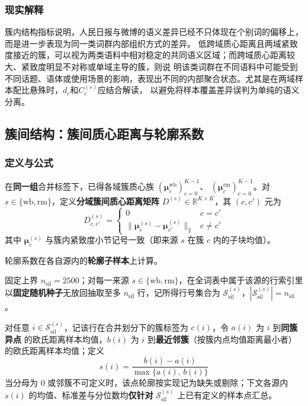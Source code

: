 \documentclass[withoutpreface]{cumcmthesis}
\begin{document}
\FloatBarrier

\subsubsection{现实解释}
簇内结构指标说明，人民日报与微博的语义差异已经不只体现在个别词的偏移上，而是进一步表现为同一类词群内部组织方式的差异。
低跨域质心距离且两域紧致度接近的簇，可以视为两类语料中相对稳定的共同语义区域；而跨域质心距离较大、紧致度明显不对称或单域主导的簇，则说
明该类词群在不同语料中可能受到不同话题、语体或使用场景的影响，表现出不同的内部聚合状态。尤其是在两域样本配比悬殊时，$d_c$和$C_c^{(s)}$应结合解读，
以避免将样本覆盖差异误判为单纯的语义分离。

\subsection{簇间结构：簇间质心距离与轮廓系数}

\subsubsection{定义与公式}
在\textbf{同一组}合并标签下，已得各域簇质心族 $(\boldsymbol{\mu}^{\mathrm{wb}}_c)_{c=0}^{K-1}$、
$(\boldsymbol{\mu}^{\mathrm{rm}}_c)_{c=0}^{K-1}$。对 $s\in\{\mathrm{wb},\mathrm{rm}\}$，定义\textbf{分域簇间质心距离矩阵}
$D^{(s)}\in\mathbb{R}^{K\times K}$，其 $(c,c')$ 元为
\begin{equation}
  D^{(s)}_{c,c'} =
  \begin{cases}
    0 & c=c'\\[0.25em]
    \bigl\lVert \boldsymbol{\mu}^{(s)}_c - \boldsymbol{\mu}^{(s)}_{c'} \bigr\rVert_2 & c\neq c'
  \end{cases}
\end{equation}
其中 $\boldsymbol{\mu}^{(s)}_c$ 与簇内紧致度小节记号一致（即来源 $s$ 在簇 $c$ 内的子块均值）。

轮廓系数在各自源内的\textbf{轮廓子样本}上计算。

固定上界 $n_{\mathrm{sil}}=2500$；对每一来源
$s\in\{\mathrm{wb},\mathrm{rm}\}$，在全词表中属于该源的行索引里以\textbf{固定随机种子}无放回抽取至多
$n_{\mathrm{sil}}$ 行，记所得行号集合为 $\mathcal{S}_{\mathrm{sil}}^{(s)}，|\mathcal{S}_{\mathrm{sil}}^{(s)}|=n_{\mathrm{sil}}$。

对任意 $i\in\mathcal{S}_{\mathrm{sil}}^{(s)}$，记该行在合并划分下的簇标签为 $c(i)$，令 $a(i)$ 为 $i$ 到\textbf{同簇异点}
的欧氏距离样本均值，$b(i)$ 为 $i$ 到\textbf{最近邻簇}（按簇内点均值距离最小者）的欧氏距离样本均值；定义
\begin{equation}
  s(i)=\frac{b(i)-a(i)}{\max\{a(i),\,b(i)\}} 
\end{equation}
当分母为 $0$ 或邻簇不可定义时，该点轮廓按实现记为缺失或剔除；下文各源内 $s(i)$ 的均值、标准差与分位数均\textbf{仅针对}
$\mathcal{S}_{\mathrm{sil}}^{(s)}$ 上已有定义的样本点汇总。
\end{document}
